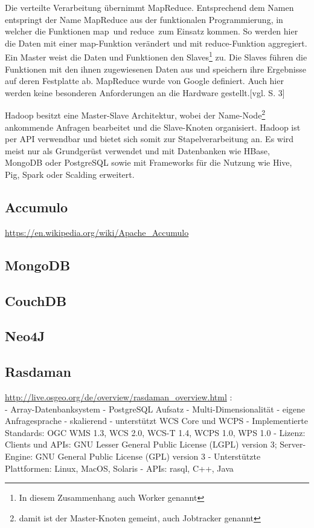 Die verteilte Verarbeitung übernimmt MapReduce.
Entsprechend dem Namen entspringt der Name MapReduce aus der funktionalen Programmierung, in welcher die Funktionen \glqq map\grqq \ und \glqq reduce\grqq \ zum Einsatz kommen.
So werden hier die Daten mit einer map-Funktion verändert und mit reduce-Funktion aggregiert.
Ein Master weist die Daten und Funktionen den Slaves\footnote{In diesem Zusammenhang auch Worker genannt} zu.
Die Slaves führen die Funktionen mit den ihnen zugewiesenen Daten aus und speichern ihre Ergebnisse auf deren Festplatte ab.
MapReduce wurde von Google definiert.
Auch hier werden keine besonderen Anforderungen an die Hardware gestellt.[vgl. \cite{paper:mapreduce} S. 3]


Hadoop besitzt eine Master-Slave Architektur, wobei der Name-Node\footnote{damit ist der Master-Knoten gemeint, auch Jobtracker genannt} ankommende Anfragen bearbeitet und die Slave-Knoten organisiert.
Hadoop ist per API verwendbar und bietet sich somit zur Stapelverarbeitung an. %
Es wird meist nur als Grundgerüst verwendet und mit Datenbanken wie HBase, MongoDB oder PostgreSQL sowie mit Frameworks für die Nutzung wie Hive, Pig, Spark oder Scalding erweitert.





\subsection{Accumulo}
\url{https://en.wikipedia.org/wiki/Apache_Accumulo}

\subsection{MongoDB}

\subsection{CouchDB}

\subsection{Neo4J}

\newpage

\subsection{Rasdaman}

\url{http://live.osgeo.org/de/overview/rasdaman_overview.html} :\\
- Array-Datenbanksystem
- PostgreSQL Aufsatz
- Multi-Dimensionalität
- eigene Anfragesprache
- skalierend
- unterstützt WCS Core und WCPS
- Implementierte Standards: OGC WMS 1.3, WCS 2.0, WCS-T 1.4, WCPS 1.0, WPS 1.0
- Lizenz: Clients und APIs: GNU Lesser General Public License (LGPL) version 3; Server-Engine: GNU General Public License (GPL) version 3
- Unterstützte Plattformen: Linux, MacOS, Solaris
- APIs: rasql, C++, Java


